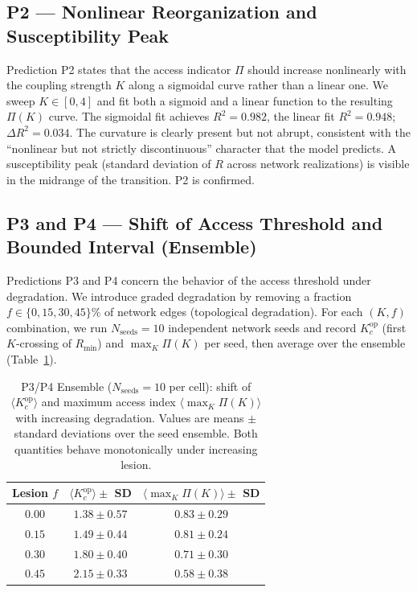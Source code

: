\documentclass[11pt,a4paper]{article}
\theoremstyle{plain}
\theoremstyle{definition}
\theoremstyle{remark}
\begin{document}
\subsection{P2 --- Nonlinear Reorganization and Susceptibility Peak}

Prediction P2 states that the access indicator $\Pi$ should increase nonlinearly with the coupling strength $K$ along a sigmoidal curve rather than a linear one. We sweep $K \in [0, 4]$ and fit both a sigmoid and a linear function to the resulting $\Pi(K)$ curve. The sigmoidal fit achieves $R^2 = 0.982$, the linear fit $R^2 = 0.948$; $\Delta R^2 = 0.034$. The curvature is clearly present but not abrupt, consistent with the ``nonlinear but not strictly discontinuous'' character that the model predicts. A susceptibility peak (standard deviation of $R$ across network realizations) is visible in the midrange of the transition. P2 is confirmed.

\subsection{P3 and P4 --- Shift of Access Threshold and Bounded Interval (Ensemble)}

Predictions P3 and P4 concern the behavior of the access threshold under degradation. We introduce graded degradation by removing a fraction $f \in \{0, 15, 30, 45\}\%$ of network edges (topological degradation). For each $(K, f)$ combination, we run $N_{\mathrm{seeds}} = 10$ independent network seeds and record $K_c^{\mathrm{op}}$ (first $K$-crossing of $R_{\min}$) and $\max_K \Pi(K)$ per seed, then average over the ensemble (Table~\ref{tab:v2}).

\begin{table}[t]
\centering
\caption{P3/P4 Ensemble ($N_{\mathrm{seeds}} = 10$ per cell): shift of $\langle K_c^{\mathrm{op}}\rangle$ and maximum access index $\langle\max_K \Pi(K)\rangle$ with increasing degradation. Values are means $\pm$ standard deviations over the seed ensemble. Both quantities behave monotonically under increasing lesion.}
\label{tab:v2}
\begin{tabular}{ccc}
\hline
Lesion $f$ & $\langle K_c^{\mathrm{op}}\rangle \pm $ SD & $\langle\max_K \Pi(K)\rangle \pm $ SD \\
\hline
$0.00$ & $1.38 \pm 0.57$ & $0.83 \pm 0.29$ \\
$0.15$ & $1.49 \pm 0.44$ & $0.81 \pm 0.24$ \\
$0.30$ & $1.80 \pm 0.40$ & $0.71 \pm 0.30$ \\
$0.45$ & $2.15 \pm 0.33$ & $0.58 \pm 0.38$ \\
\hline
\end{tabular}
\end{table}
\end{document}
